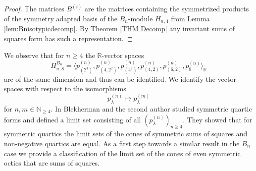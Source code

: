 \documentclass[11pt,a4paper]{amsart}
\numberwithin{equation}{section}
\theoremstyle{definition}
\newcommand{\N}{\mathbb{N}}
\newcommand{\R}{\mathbb{R}}
\numberwithin{thm}{section}
\theoremstyle{break}
\numberwithin{subcase}{case}
\begin{document}
\begin{proof}
The matrices $B^{(i)}$ are the matrices containing the symmetrized products of the symmetry adapted basis of the $B_n$-module $H_{n,4}$ from Lemma \ref{lem:Bnisotypicdecomp}. By Theorem \ref{THM Decomp} any invariant sums of squares form has such a representation.
\end{proof} 
 
 
We observe that for $n \geq 4$ the $\R$-vector spaces $$ H_{n,8}^{B_n} = \langle p_{(2^4)}^{(n)},p_{(4,2^2)}^{(n)},p_{(4^2)}^{(n)},p_{(4,2)}^{(n)},p_{(6,2)}^{(n)},p_{8}^{(n)}\rangle_\R$$ are of the same dimension and thus can be identified. We identify the vector spaces with respect to the isomorphisms $$ p_{\lambda}^{(n)} \mapsto p_{\lambda}^{(m)}$$ for $n,m \in \N_{\geq 4}$. In \cite{blekrie} Blekherman and the second author studied symmetric quartic forms and defined a limit set consisting of all $\left( p_{\lambda}^{(n)}\right)_{n\geq 4}$. They showed that for symmetric quartics the limit sets of the cones of symmetric sums of squares and non-negative quartics are equal. As a first step towards a similar result in the $B_n$ case we provide a classification of the limit set of the cones of even symmetric octics that are sums of squares. 
\end{document}
